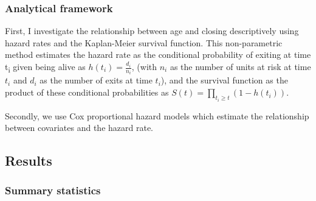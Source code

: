 \documentclass[12pt]{article}
\begin{document}
\subsubsection*{Analytical framework}



First, I investigate the relationship between age and closing descriptively using hazard rates and the Kaplan-Meier survival function.
This non-parametric method estimates the hazard rate as the conditional probability of exiting at time t\textsubscript{i} given being alive as \(h(t_i) = \frac{d_i}{n_i}\), (with \(n_i\) as the number of units at risk at time \(t_i\) and \(d_i\) as the number of exits at time \(t_i\)), and the survival function as the product of these conditional probabilities as \(S(t) = \prod_{t_i \geq t} \left(1-h(t_i) \right)\).





Secondly, we use Cox proportional hazard models which estimate the relationship between covariates and the hazard rate.
\subsection*{Results}


\subsubsection*{Summary statistics}
\end{document}
